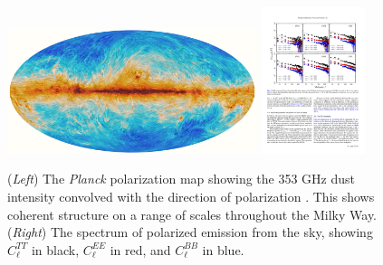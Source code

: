 \begin{figure}[t]
\begin{center}
\includegraphics[width=0.65\textwidth, clip]{figs/Planck.jpg}
\includegraphics[width=0.27\textwidth, clip]{figs/PlanckForegrounds.pdf}
\end{center}
\vspace{-3mm}
\caption{\label{fig.planck} 
(\emph{Left}) The \emph{Planck} polarization map showing the 353 GHz dust
intensity convolved with the direction of polarization
\citep{PlanckIntermediateXIX15}.  This shows coherent structure on a range of
scales throughout the Milky Way.
(\emph{Right}) The spectrum of polarized emission from the sky, showing
$C_\ell^{TT}$ in
black, $C_\ell^{EE}$ in red, and $C_\ell^{BB}$ in blue.
}
\vspace{-4mm}
\end{figure}

